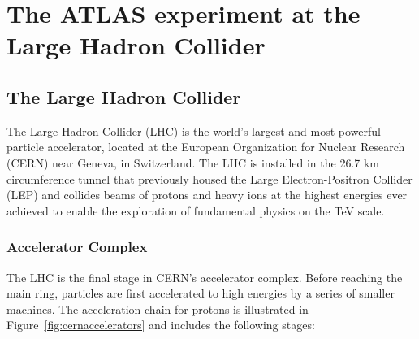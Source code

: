 
\chapter{The ATLAS experiment at the Large Hadron Collider}
\label{chap:atlas}

\section{The Large Hadron Collider}

The Large Hadron Collider (LHC) is the world's largest and most powerful particle accelerator, located at the European Organization for Nuclear Research (CERN) near Geneva, in Switzerland. The LHC is installed in the 26.7 km circumference tunnel that previously housed the Large Electron-Positron Collider (LEP) and collides beams of protons and heavy ions at the highest energies ever achieved to enable the exploration of fundamental physics on the TeV scale.

\subsection{Accelerator Complex}

The LHC is the final stage in CERN's accelerator complex. Before reaching the main ring, particles are first accelerated to high energies by a series of smaller machines. The acceleration chain for protons is illustrated in Figure~\ref{fig:cernaccelerators} and includes the following stages:

